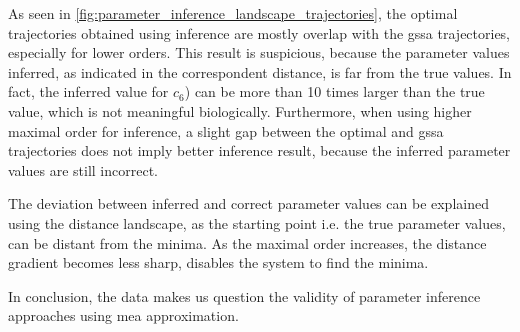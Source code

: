 As seen in \autoref{fig:parameter_inference_landscape_trajectories}, the optimal trajectories obtained using inference are mostly overlap with the \gls{gssa} trajectories, especially for lower orders.  This result is suspicious, because the parameter values inferred, as indicated in the correspondent distance, is far from the true values. 
In fact, the inferred value for $c_6$) can be more than 10 times larger than the true value, which is not meaningful biologically.
Furthermore, when using higher maximal order for inference, a slight gap between the optimal and \gls{gssa} trajectories does not imply better inference result, because the inferred parameter values are still incorrect. 

The deviation between inferred and correct parameter values can be explained using the distance landscape, as the starting point i.e. the true parameter values, can be distant from the minima. As the maximal order increases, the distance gradient becomes less sharp, disables the system to find the minima.

In conclusion, the data makes us question the validity of parameter inference approaches using \gls{mea} approximation.